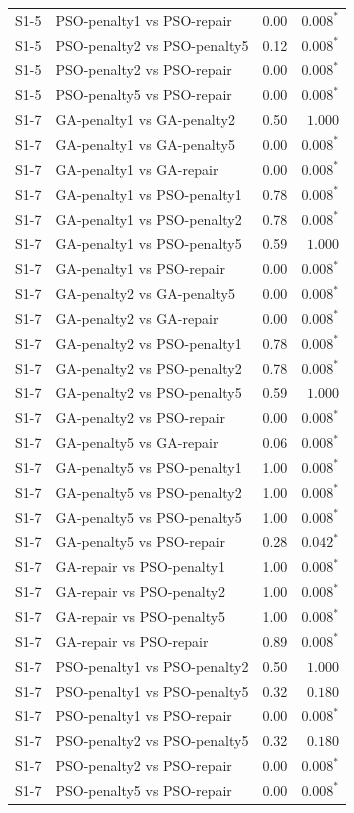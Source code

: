 \begin{tabular}{llrr}
S1-5 & PSO-penalty1 vs PSO-repair & 0.00 & $0.008^{*}$ \\
S1-5 & PSO-penalty2 vs PSO-penalty5 & 0.12 & $0.008^{*}$ \\
S1-5 & PSO-penalty2 vs PSO-repair & 0.00 & $0.008^{*}$ \\
S1-5 & PSO-penalty5 vs PSO-repair & 0.00 & $0.008^{*}$ \\
S1-7 & GA-penalty1 vs GA-penalty2 & 0.50 & $1.000$ \\
S1-7 & GA-penalty1 vs GA-penalty5 & 0.00 & $0.008^{*}$ \\
S1-7 & GA-penalty1 vs GA-repair & 0.00 & $0.008^{*}$ \\
S1-7 & GA-penalty1 vs PSO-penalty1 & 0.78 & $0.008^{*}$ \\
S1-7 & GA-penalty1 vs PSO-penalty2 & 0.78 & $0.008^{*}$ \\
S1-7 & GA-penalty1 vs PSO-penalty5 & 0.59 & $1.000$ \\
S1-7 & GA-penalty1 vs PSO-repair & 0.00 & $0.008^{*}$ \\
S1-7 & GA-penalty2 vs GA-penalty5 & 0.00 & $0.008^{*}$ \\
S1-7 & GA-penalty2 vs GA-repair & 0.00 & $0.008^{*}$ \\
S1-7 & GA-penalty2 vs PSO-penalty1 & 0.78 & $0.008^{*}$ \\
S1-7 & GA-penalty2 vs PSO-penalty2 & 0.78 & $0.008^{*}$ \\
S1-7 & GA-penalty2 vs PSO-penalty5 & 0.59 & $1.000$ \\
S1-7 & GA-penalty2 vs PSO-repair & 0.00 & $0.008^{*}$ \\
S1-7 & GA-penalty5 vs GA-repair & 0.06 & $0.008^{*}$ \\
S1-7 & GA-penalty5 vs PSO-penalty1 & 1.00 & $0.008^{*}$ \\
S1-7 & GA-penalty5 vs PSO-penalty2 & 1.00 & $0.008^{*}$ \\
S1-7 & GA-penalty5 vs PSO-penalty5 & 1.00 & $0.008^{*}$ \\
S1-7 & GA-penalty5 vs PSO-repair & 0.28 & $0.042^{*}$ \\
S1-7 & GA-repair vs PSO-penalty1 & 1.00 & $0.008^{*}$ \\
S1-7 & GA-repair vs PSO-penalty2 & 1.00 & $0.008^{*}$ \\
S1-7 & GA-repair vs PSO-penalty5 & 1.00 & $0.008^{*}$ \\
S1-7 & GA-repair vs PSO-repair & 0.89 & $0.008^{*}$ \\
S1-7 & PSO-penalty1 vs PSO-penalty2 & 0.50 & $1.000$ \\
S1-7 & PSO-penalty1 vs PSO-penalty5 & 0.32 & $0.180$ \\
S1-7 & PSO-penalty1 vs PSO-repair & 0.00 & $0.008^{*}$ \\
S1-7 & PSO-penalty2 vs PSO-penalty5 & 0.32 & $0.180$ \\
S1-7 & PSO-penalty2 vs PSO-repair & 0.00 & $0.008^{*}$ \\
S1-7 & PSO-penalty5 vs PSO-repair & 0.00 & $0.008^{*}$ \\
\bottomrule
\end{tabular}
